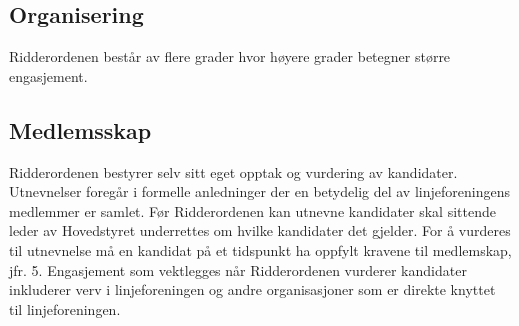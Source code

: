 \subsection{Organisering}{
Ridderordenen består av flere grader hvor høyere grader betegner større engasjement.
}

\subsection{Medlemsskap}{
Ridderordenen bestyrer selv sitt eget opptak og vurdering av kandidater. Utnevnelser foregår i formelle anledninger der en betydelig del av linjeforeningens medlemmer er samlet. Før Ridderordenen kan utnevne kandidater skal sittende leder av Hovedstyret underrettes om hvilke kandidater det gjelder. For å vurderes til utnevnelse må en kandidat på et tidspunkt ha oppfylt kravene til medlemskap, jfr. 5. Engasjement som vektlegges når Ridderordenen vurderer kandidater inkluderer verv i linjeforeningen og andre organisasjoner som er direkte knyttet til linjeforeningen.
}
